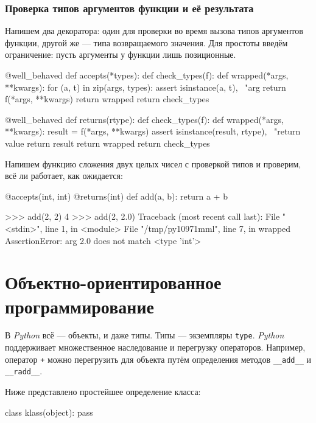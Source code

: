 \subsubsection{Проверка типов аргументов функции и её результата}
Напишем два декоратора: один для проверки во время вызова типов аргументов функции, другой же — типа возвращаемого значения. Для простоты введём ограничение: пусть аргументы у функции лишь позиционные.
\begin{pylst}{}{}
@well_behaved
def accepts(*types):
    def check_types(f):
        def wrapped(*args, **kwargs):
            for (a, t) in zip(args, types):
                assert isinstance(a, t), \
                       "arg %
            return f(*args, **kwargs)
        return wrapped
    return check_types

@well_behaved
def returns(rtype):
    def check_types(f):
        def wrapped(*args, **kwargs):
            result = f(*args, **kwargs)
            assert isinstance(result, rtype), \
                   "return value %
            return result
        return wrapped
    return check_types
\end{pylst}

Напишем функцию сложения двух целых чисел с проверкой типов и проверим, всё ли работает, как ожидается:
\begin{pylst}{}{}
@accepts(int, int)
@returns(int)
def add(a, b):
    return a + b

>>> add(2, 2)
4
>>> add(2, 2.0)
Traceback (most recent call last):
  File "<stdin>", line 1, in <module>
  File "/tmp/py10971mml", line 7, in wrapped
AssertionError: arg 2.0 does not match <type 'int'>
\end{pylst}

\section{Объектно-ориентированное программирование}
\label{sec:py-oop}

В \emph{Python} всё — объекты, и даже типы. Типы — экземпляры \lstinline{type}. \emph{Python} поддерживает множественное наследование и перегрузку операторов. Например, оператор \lstinline{+} можно перегрузить для объекта путём определения методов \lstinline{__add__} и \lstinline{__radd__}.

Ниже представлено простейшее определение класса:
\begin{pylst}{}{}
class klass(object):
    pass
\end{pylst}

